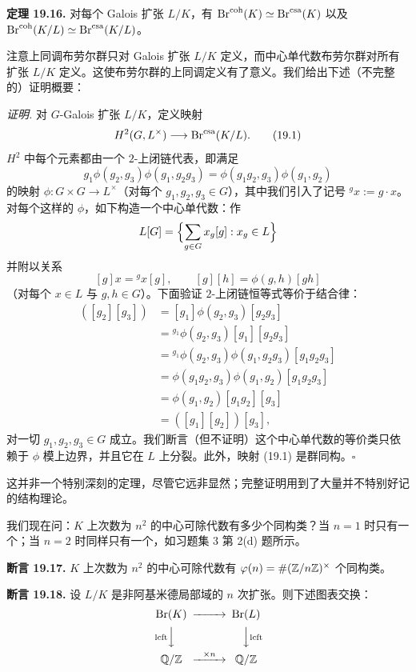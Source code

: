 \textbf{定理 19.16.} 对每个 Galois 扩张 $L/K$，有 $\operatorname{Br}^{\mathrm{coh}}(K)\simeq\operatorname{Br}^{\mathrm{csa}}(K)$ 以及 $\operatorname{Br}^{\mathrm{coh}}(K/L)\simeq\operatorname{Br}^{\mathrm{csa}}(K/L)$。

注意上同调布劳尔群只对 Galois 扩张 $L/K$ 定义，而中心单代数布劳尔群对所有扩张 $L/K$ 定义。这使布劳尔群的上同调定义有了意义。我们给出下述（不完整的）证明概要：

\textit{证明.} 对 $G$-Galois 扩张 $L/K$，定义映射
\begin{equation*}
H^2(G,L^\times)\longrightarrow \operatorname{Br}^{\mathrm{csa}}(K/L). \tag{19.1}
\end{equation*}
$H^2$ 中每个元素都由一个 $2$-上闭链代表，即满足
\[
g_1\phi(g_2,g_3)\phi(g_1,g_2g_3)=\phi(g_1g_2,g_3)\phi(g_1,g_2)
\]
的映射 $\phi:G\times G\to L^\times$（对每个 $g_1,g_2,g_3\in G$），其中我们引入了记号 ${}^g x:=g\cdot x$。对每个这样的 $\phi$，如下构造一个中心单代数：作
\[
L[G]=\Bigl\{\sum_{g\in G}x_g[g]:x_g\in L\Bigr\}
\]
并附以关系
\[
[g]x={}^g x[g],\qquad [g][h]=\phi(g,h)[gh]
\]
（对每个 $x\in L$ 与 $g,h\in G$）。下面验证 $2$-上闭链恒等式等价于结合律：
\begin{align*}
[g_1]([g_2][g_3]) &= [g_1]\phi(g_2,g_3)[g_2g_3]\\
&= {}^{g_1}\phi(g_2,g_3)[g_1][g_2g_3]\\
&= {}^{g_1}\phi(g_2,g_3)\phi(g_1,g_2g_3)[g_1g_2g_3]\\
&= \phi(g_1g_2,g_3)\phi(g_1,g_2)[g_1g_2g_3]\\
&= \phi(g_1,g_2)[g_1g_2][g_3]\\
&= ([g_1][g_2])[g_3],
\end{align*}
对一切 $g_1,g_2,g_3\in G$ 成立。我们断言（但不证明）这个中心单代数的等价类只依赖于 $\phi$ 模上边界，并且它在 $L$ 上分裂。此外，映射 (19.1) 是群同构。\hfill$\square$

这并非一个特别深刻的定理，尽管它远非显然；完整证明用到了大量并不特别好记的结构理论。

我们现在问：$K$ 上次数为 $n^2$ 的中心可除代数有多少个同构类？当 $n=1$ 时只有一个；当 $n=2$ 时同样只有一个，如习题集 3 第 2(d) 题所示。

\textbf{断言 19.17.} $K$ 上次数为 $n^2$ 的中心可除代数有 $\varphi(n)=\#(\mathbb{Z}/n\mathbb{Z})^\times$ 个同构类。

\textbf{断言 19.18.} 设 $L/K$ 是非阿基米德局部域的 $n$ 次扩张。则下述图表交换：
\[
\begin{CD}
\Br(K) @>>> \Br(L)\\
@V{\mathrm{lcft}}VV @VV{\mathrm{lcft}}V\\
\Q/\Z @>{\times n}>> \Q/\Z
\end{CD}
\]


